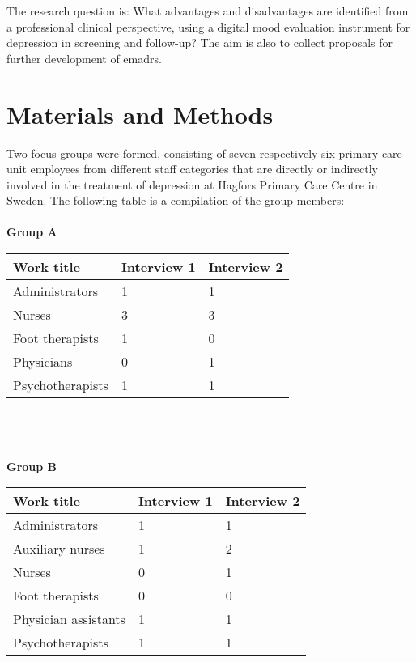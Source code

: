 \documentclass[12pt,a4paper,oneside]{article}
\let\oldcite\cite
\renewcommand*\cite[1]{\textsuperscript{\oldcite{#1}}}
\begin{document}
The research question is: What advantages and disadvantages are identified from a professional clinical perspective, using a digital mood evaluation instrument for depression in screening and follow-up? The aim is also to collect proposals for further development of e{\sc madrs}.

\section*{Materials and Methods}
Two focus groups were formed, consisting of seven respectively six primary care unit employees from different staff categories that are directly or indirectly involved in the treatment of depression at Hagfors Primary Care Centre in Sweden. The following table is a compilation of the group members:\\\\
{\bf Group A}\\
\begin{tabular}{p{10em}|l|l}
Work title & Interview 1 & Interview 2 \\
\hline
Administrators & 1 & 1 \\
Nurses & 3 & 3 \\
Foot therapists & 1 & 0\\
Physicians & 0 & 1\\
Psychotherapists & 1 & 1\\
\hline
\end{tabular}\\\ \\\ \\
{\bf Group B}\\
\begin{tabular}{p{10em}|l|l}
Work title & Interview 1 & Interview 2 \\
\hline
Administrators & 1 & 1 \\
Auxiliary nurses & 1 & 2 \\
Nurses & 0 & 1 \\
Foot therapists & 0 & 0\\
Physician assistants & 1 & 1\\
Psychotherapists & 1 & 1\\
\hline
\end{tabular}\\ \\\ \\\ 
\end{document}

